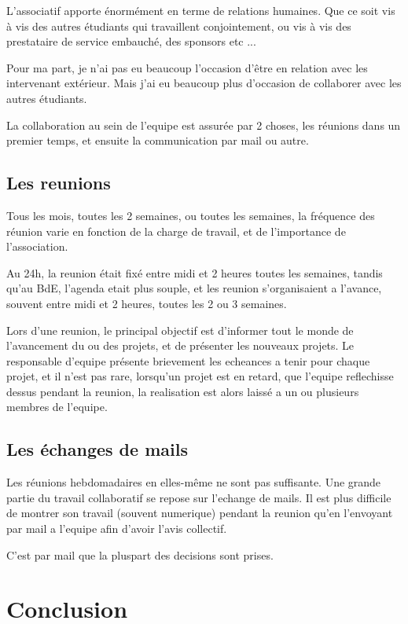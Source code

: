     L'associatif apporte énormément en terme de relations humaines. Que ce soit vis à vis des autres étudiants qui travaillent conjointement, ou vis à vis des prestataire de service embauché, des sponsors etc ...
    
    Pour ma part, je n'ai pas eu beaucoup l'occasion d'être en relation avec les intervenant extérieur.
    Mais j'ai eu beaucoup plus d'occasion de collaborer avec les autres étudiants.
    
    La collaboration au sein de l'equipe est assurée par 2 choses, les réunions dans un premier temps, et ensuite la communication par mail ou autre.

    \subsection{Les reunions}

        Tous les mois, toutes les 2 semaines, ou toutes les semaines, la fréquence des réunion varie en fonction de la charge de travail, et de l'importance de l'association.

        Au 24h, la reunion était fixé entre midi et 2 heures toutes les semaines, tandis qu'au BdE, l'agenda etait plus souple, et les reunion s'organisaient a l'avance, souvent entre midi et 2 heures, toutes les 2 ou 3 semaines.

        Lors d'une reunion, le principal objectif est d'informer tout le monde de l'avancement du ou des projets, et de présenter les nouveaux projets.
        Le responsable d'equipe présente brievement les echeances a tenir pour chaque projet, et il n'est pas rare, lorsqu'un projet est en retard, que l'equipe reflechisse dessus pendant la reunion, la realisation est alors laissé a un ou plusieurs membres de l'equipe.
    
    \subsection{Les échanges de mails}

        Les réunions hebdomadaires en elles-même ne sont pas suffisante. Une grande partie du travail collaboratif se repose sur l'echange de mails.
        Il est plus difficile de montrer son travail (souvent numerique) pendant la reunion qu'en l'envoyant par mail a l'equipe afin d'avoir l'avis collectif.

        C'est par mail que la pluspart des decisions sont prises.        
        
\section{Conclusion}

